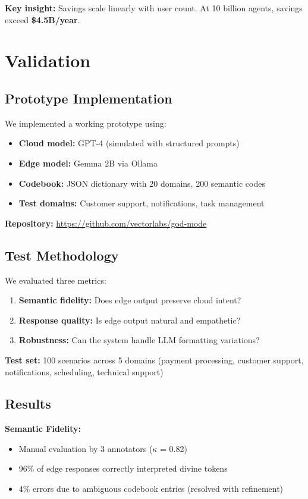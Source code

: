 \documentclass{article}
\begin{document}
\textbf{Key insight:} Savings scale linearly with user count. At 10 billion agents, savings exceed \textbf{\$4.5B/year}.

\section{Validation}

\subsection{Prototype Implementation}

We implemented a working prototype using:
\begin{itemize}
    \item \textbf{Cloud model:} GPT-4 (simulated with structured prompts)
    \item \textbf{Edge model:} Gemma 2B via Ollama
    \item \textbf{Codebook:} JSON dictionary with 20 domains, 200 semantic codes
    \item \textbf{Test domains:} Customer support, notifications, task management
\end{itemize}

\textbf{Repository:} \url{https://github.com/vectorlabs/god-mode}

\subsection{Test Methodology}

We evaluated three metrics:
\begin{enumerate}
    \item \textbf{Semantic fidelity:} Does edge output preserve cloud intent?
    \item \textbf{Response quality:} Is edge output natural and empathetic?
    \item \textbf{Robustness:} Can the system handle LLM formatting variations?
\end{enumerate}

\textbf{Test set:} 100 scenarios across 5 domains (payment processing, customer support, notifications, scheduling, technical support)

\subsection{Results}

\textbf{Semantic Fidelity:}
\begin{itemize}
    \item Manual evaluation by 3 annotators ($\kappa$ = 0.82)
    \item 96\% of edge responses correctly interpreted divine tokens
    \item 4\% errors due to ambiguous codebook entries (resolved with refinement)
\end{itemize}
\end{document}
